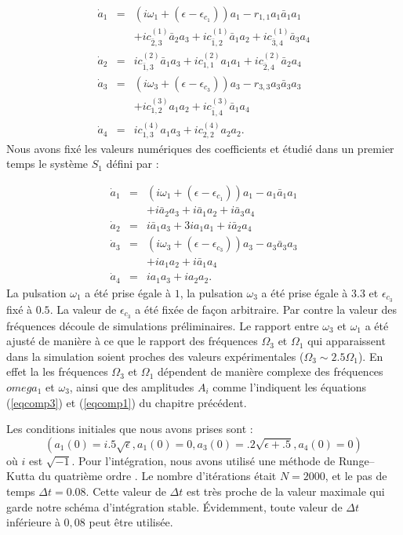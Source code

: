 \documentclass{book}
\begin{document}
\begin{eqnarray}
\dot{a}_1&=&(i\omega_1+(\epsilon-\epsilon_{c_1}))a_1-r_{1,1}a_1\bar{a}_1a_1\nonumber\\
&&+ic^{(1)}_{\bar{2},3}\bar{a}_2{a}_3+ic^{(1)}_{\bar{1},2}\bar{a}_1a_2+ic^{(1)}_{\bar{3},4}\bar{a}_3a_4\\
\dot{a}_2&=&ic^{(2)}_{\bar{1},3}\bar{a}_1{a}_3+ic^{(2)}_{1,1}a_1a_1+ic^{(2)}_{\bar{2},4}\bar{a}_2a_4\\
\dot{a}_3&=&(i\omega_3+(\epsilon-\epsilon_{c_3}))a_3-r_{3,3}a_3\bar{a}_3a_3\nonumber\\
&&+ic^{(3)}_{1,2}a_1a_2+ic^{(3)}_{\bar{1},4}\bar{a}_1a_4\\
\dot{a}_4&=&ic^{(4)}_{1,3}a_1a_3+ic^{(4)}_{2,2}a_2a_2.
\end{eqnarray}
Nous avons fix\'e les valeurs num\'eriques des coefficients
et \'etudi\'e dans un premier temps le syst\`eme $S_1$ d\'efini par :


\begin{eqnarray}
\dot{a}_1&=&(i\omega_1+(\epsilon-\epsilon_{c_1}))a_1-a_1\bar{a}_1a_1\nonumber\\
&&+i\bar{a}_2{a}_3+i\bar{a}_1a_2+i\bar{a}_3a_4\\
\dot{a}_2&=&i\bar{a}_1{a}_3+3ia_1a_1+i\bar{a}_2a_4\\
\dot{a}_3&=&(i\omega_3+(\epsilon-\epsilon_{c_3}))a_3-a_3\bar{a}_3a_3\nonumber\\
&&+i a_1a_2+i\bar{a}_1a_4\\
\dot{a}_4&=&ia_1a_3+ia_2a_2.
\end{eqnarray}
La pulsation $\omega_1$
a \'et\'e prise \'egale \`a $1$, la pulsation $\omega_3$  a \'et\'e
prise \'egale \`a 
$3.3$ et $\epsilon_{c_3}$ fix\'e \`a
$0.5$. La valeur de $\epsilon_{c_3}$ a \'et\'e fix\'ee de fa\c con
arbitraire. Par contre la valeur des fr\'equences d\'ecoule de
simulations pr\'eliminaires.  
Le rapport entre $\omega_3$ et $\omega_1$ a \'et\'e ajust\'e de
mani\`ere \`a ce 
que le rapport des  fr\'equences $\Omega_3$ et $\Omega_1$ qui
apparaissent dans la simulation soient proches 
des valeurs exp\'erimentales ($\Omega_3\sim 2.5\Omega_1$). En effet la
les fr\'equences $\Omega_3$ et $\Omega_1$ d\'ependent de mani\`ere
complexe des fr\'equences $omega_1$ et $\omega_3$, ainsi que des
amplitudes $A_i$ comme
l'indiquent les \'equations (\ref{eqcomp3}) et (\ref{eqcomp1}) du
chapitre pr\'ec\'edent.
 

Les conditions initiales que nous avons prises sont :
\begin{equation}
(a_1(0)=i.5\sqrt{\epsilon},a_1(0)=0,a_3(0)=.2\sqrt{\epsilon+.5},a_4(0)=0)
\end{equation}
o\`u $i$ est $\sqrt{-1}$.
Pour l'int\'egration, nous avons utilis\'e une m\'ethode de
Runge--Kutta du quatri\`eme ordre \cite{Press92}. 
Le nombre d'it\'erations
 \'etait $N=2000$, et le pas de temps
$\Delta t=0.08$. Cette valeur de $\Delta t$ est tr\`es proche de la
valeur maximale qui garde notre
sch\'ema d'int\'egration stable. \'Evidemment, toute valeur de $\Delta
t$ inf\'erieure \`a $0,08$ peut \^etre utilis\'ee.
\end{document}
